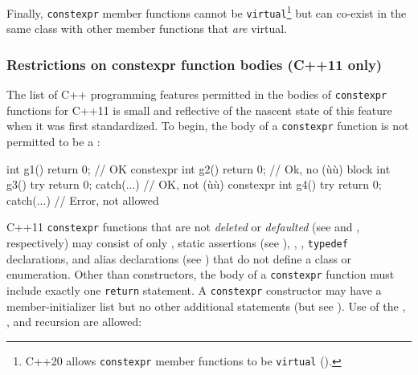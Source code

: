 Finally, \lstinline!constexpr! member functions cannot be
\lstinline!virtual!{\cprotect\footnote{C++20 allows \lstinline!constexpr!
member functions to be \lstinline!virtual! (\cite{dimov18}).}} but can co-exist in the same class with
other member functions that \emph{are} virtual.

\subsubsection[Restrictions on \lstinline!constexpr! function bodies (C++11 only)]{Restrictions on {\SubsubsecCode constexpr} function bodies (C++11 only)}\label{restrictions-on-constexpr-function-bodies-(c++11-only)}

The list of C++ programming features permitted in the bodies of
\lstinline!constexpr! functions for C++11 is small and reflective of the
nascent state of this feature when it was first standardized. To begin,
the body of a \lstinline!constexpr! function is not permitted to be a
:

\begin{emcppslisting}
          int g1()     { return 0; }                // OK
constexpr int g2()     { return 0; }                // Ok, no (ù{}ù) block
          int g3() try { return 0; } catch(...) {}  // OK, not (ù{}ù)
constexpr int g4() try { return 0; } catch(...) {}  // Error, not allowed
\end{emcppslisting}
    

\noindent C++11 \lstinline!constexpr! functions that are not \emph{deleted} or
\emph{defaulted} (see  and
, respectively) may consist of only
, static assertions (see ), ,
, \lstinline!typedef! declarations, and
alias declarations (see ) that do not
define a class or enumeration. Other than constructors, the body of a
\lstinline!constexpr! function must include exactly one \lstinline!return!
statement. A \lstinline!constexpr! constructor may have a
member-initializer list but no other additional statements (but see
). Use of the
, , and recursion are
allowed:

